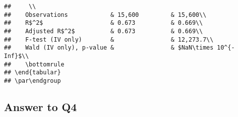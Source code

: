 \documentclass[
]{article}
\begin{document}
\begin{verbatim}
##     \\
##    Observations            & 15,600         & 15,600\\  
##    R$^2$                   & 0.673          & 0.669\\  
##    Adjusted R$^2$          & 0.673          & 0.669\\  
##    F-test (IV only)        &                & 12,273.7\\  
##    Wald (IV only), p-value &                & $NaN\times 10^{-Inf}$\\   
##    \bottomrule
## \end{tabular}
## \par\endgroup
\end{verbatim}

\hypertarget{answer-to-q4}{%
\subsection{Answer to Q4}\label{answer-to-q4}}
\end{document}
